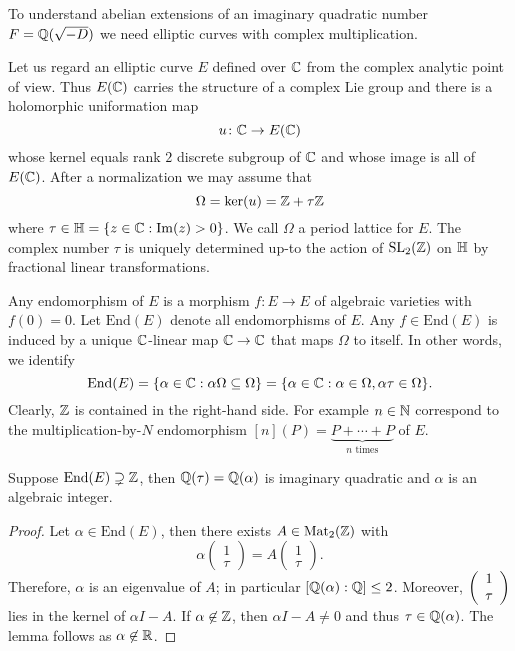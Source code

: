 To understand abelian extensions of an imaginary quadratic number
$F={\mathbb{Q}}(\sqrt{-D})$ we need elliptic curves with complex
multiplication.

Let us regard an elliptic curve $E$ defined over ${\mathbb{C}}$ from the
complex analytic point of view. Thus $E({\mathbb{C}})$ carries the structure of
a complex Lie group and there is a holomorphic uniformation map
\begin{equation*}
  u \colon {\mathbb{C}} \rightarrow E({\mathbb{C}})
\end{equation*}
whose kernel equals rank $2$ discrete subgroup of ${\mathbb{C}}$ and whose
image is all of $E({\mathbb{C}})$. After a normalization we may assume that
\begin{equation*}
  \Omega = \mathrm{ker}(u) = {\mathbb{Z}}+\tau{\mathbb{Z}}
\end{equation*}
where $\tau\in {\mathbb{H}} = \{z\in {\mathbb{C}} : \mathrm{Im}(z)>0\}$. We call
$\Omega$ a period lattice for $E$. The complex number $\tau$ is
uniquely determined up-to the action of $\mathrm{SL}_2({\mathbb{Z}})$ on ${\mathbb{H}}$
by fractional linear transformations. 

Any endomorphism of $E$ is a morphism $f\colon E\rightarrow E$ of
algebraic varieties with $f(0)=0$. Let $\mathrm{End}(E)$ denote all
endomorphisms of $E$. Any $f\in \mathrm{End}(E)$ is
induced by a unique ${\mathbb{C}}$-linear map
${\mathbb{C}}\rightarrow {\mathbb{C}}$ that maps $\Omega$ to itself. In other words, we
identify
\begin{equation*}
  \mathrm{End}(E) = \{ \alpha\in{\mathbb{C}} : \alpha \Omega \subseteq \Omega \}
  = \{\alpha\in {\mathbb{C}} : \alpha\in \Omega, \alpha\tau\in \Omega\}. 
\end{equation*}
Clearly,  ${\mathbb{Z}}$ is contained in the right-hand side. For example  $n\in{\mathbb{N}}$
correspond to the multiplication-by-$N$ endomorphism $[n](P) =
\underbrace{P+\cdots +P}_{n\text{ times}}$ of $E$.

\begin{lemma}
  Suppose $\mathrm{End}(E) \supsetneq {\mathbb{Z}}$, then
  ${\mathbb{Q}}(\tau)={\mathbb{Q}}(\alpha)$
  is imaginary
  quadratic and $\alpha$ is an algebraic integer. 
\end{lemma}
\begin{proof}
  Let $\alpha\in \mathrm{End}(E)$, then there exists $A\in\mathrm{Mat}_2({\mathbb{Z}})$ with
  \begin{equation*}
    \alpha \left(
      \begin{array}{c}
        1 \\ \tau 
      \end{array}
    \right) = %
    A\left(
      \begin{array}{c}
        1 \\ \tau 
      \end{array}
    \right).
  \end{equation*}
  Therefore, $\alpha$ is an eigenvalue of $A$; in particular
  $[{\mathbb{Q}}(\alpha):{\mathbb{Q}}]\le 2$. Moreover, $\left( \begin{array}{c} {1} \\ {\tau} \end{array} \right)$ lies in the
  kernel of $\alpha I-A$. If $\alpha\not\in {\mathbb{Z}}$, then $\alpha
  I-A\not=0$ and thus $\tau \in {\mathbb{Q}}(\alpha)$. The lemma follows as
  $\alpha\not\in{\mathbb{R}}$. 
\end{proof}

